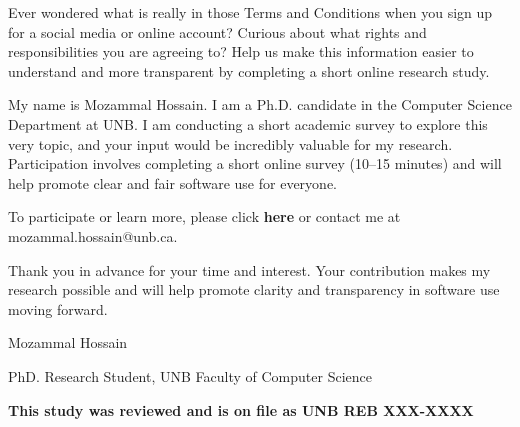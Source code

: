 \documentclass{standalone}
\begin{document}


Ever wondered what is really in those Terms and Conditions when you sign up for a social media or online account? Curious about what rights and responsibilities you are agreeing to? Help us make this information easier to understand and more transparent by completing a short online research study. 

My name is Mozammal Hossain. I am a Ph.D. candidate in the Computer Science Department at UNB. I am conducting a short academic survey to explore this very topic, and your input would be incredibly valuable for my research. Participation involves completing a short online survey (10–15 minutes) and will help promote clear and fair software use for everyone. 

To participate or learn more, please click \textbf{here} or contact me at mozammal.hossain@unb.ca. 

Thank you in advance for your time and interest. Your contribution makes my research possible and will help promote clarity and transparency in software use moving forward.


Mozammal Hossain

PhD. Research Student, UNB Faculty of Computer Science 

\textbf{This study was reviewed and is on file as UNB REB XXX-XXXX}
\end{document}
